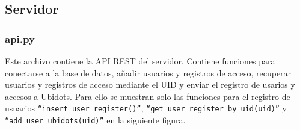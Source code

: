 \documentclass{article}
\begin{document}
\subsection{Servidor}
\subsubsection{api.py}
Este archivo contiene la API REST del servidor.
Contiene funciones para conectarse a la base de datos, añadir usuarios y registros de acceso, recuperar usuarios y registros de acceso mediante el UID y enviar el registro de usarios y accesos a Ubidots.
Para ello se muestran solo las funciones para el registro de usuarios \texttt{``insert\_user\_register()''}, \texttt{``get\_user\_register\_by\_uid(uid)''} y \texttt{``add\_user\_ubidots(uid)''} en la siguiente figura.
\end{document}
